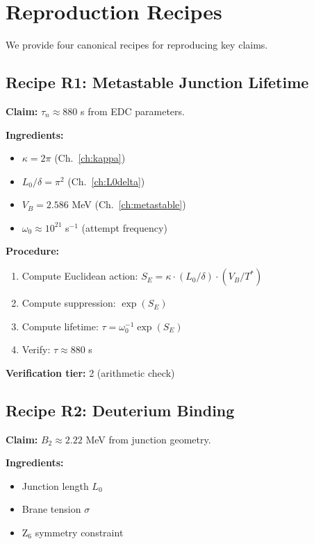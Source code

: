 \section{Reproduction Recipes}
\label{sec:repro:recipes}

We provide four canonical recipes for reproducing key claims.

\subsection{Recipe R1: Metastable Junction Lifetime}
\label{sec:repro:R1}

\textbf{Claim:} $\tau_n \approx 880$ s from EDC parameters. \tagDc

\textbf{Ingredients:}
\begin{itemize}
    \item $\kappa = 2\pi$ (Ch.~\ref{ch:kappa})
    \item $L_0/\delta = \pi^2$ (Ch.~\ref{ch:L0delta})
    \item $V_B = 2.586$ MeV (Ch.~\ref{ch:metastable})
    \item $\omega_0 \approx 10^{21}$ s$^{-1}$ (attempt frequency)
\end{itemize}

\textbf{Procedure:}
\begin{enumerate}
    \item Compute Euclidean action: $S_E = \kappa \cdot (L_0/\delta) \cdot (V_B / T^*)$
    \item Compute suppression: $\exp(S_E)$
    \item Compute lifetime: $\tau = \omega_0^{-1} \exp(S_E)$
    \item Verify: $\tau \approx 880$ s
\end{enumerate}

\textbf{Verification tier:} 2 (arithmetic check)

\subsection{Recipe R2: Deuterium Binding}
\label{sec:repro:R2}

\textbf{Claim:} $B_2 \approx 2.22$ MeV from junction geometry. \tagDc

\textbf{Ingredients:}
\begin{itemize}
    \item Junction length $L_0$
    \item Brane tension $\sigma$
    \item Z$_6$ symmetry constraint
\end{itemize}

